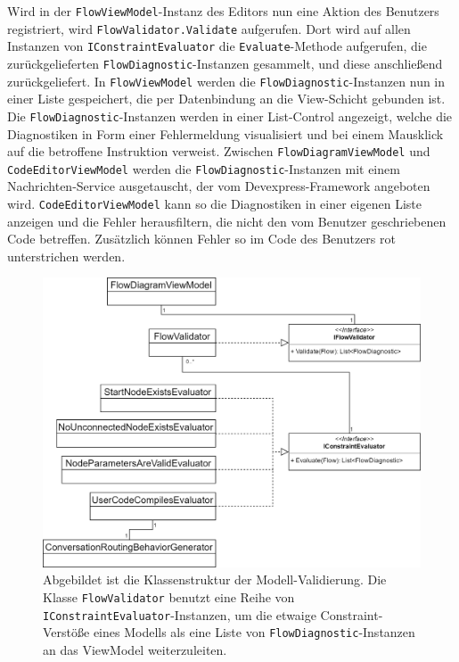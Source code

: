 Wird in der \texttt{FlowViewModel}-Instanz des Editors nun eine Aktion des Benutzers registriert, wird \texttt{FlowValidator.Validate} aufgerufen. Dort wird auf allen Instanzen von \texttt{IConstraintEvaluator} die \texttt{Evaluate}-Methode aufgerufen, die zurückgelieferten \texttt{FlowDiagnostic}-Instanzen gesammelt, und diese anschließend zurückgeliefert. In \texttt{FlowViewModel} werden die \texttt{FlowDiagnostic}-Instanzen nun in einer Liste gespeichert, die per Datenbindung an die View-Schicht gebunden ist. Die \texttt{FlowDiagnostic}-Instanzen werden in einer List-Control angezeigt, welche die Diagnostiken in Form einer Fehlermeldung visualisiert und bei einem Mausklick auf die betroffene Instruktion verweist. Zwischen \texttt{FlowDiagramViewModel} und \texttt{CodeEditorViewModel} werden die \texttt{FlowDiagnostic}-Instanzen mit einem Nachrichten-Service ausgetauscht, der vom Devexpress-Framework angeboten wird. \texttt{CodeEditorViewModel} kann so die Diagnostiken in einer eigenen Liste anzeigen und die Fehler herausfiltern, die nicht den vom Benutzer geschriebenen Code betreffen. Zusätzlich können Fehler so im Code des Benutzers rot unterstrichen werden.

\begin{figure} %
	\centering
		\includegraphics[width=\textwidth]{img/FlowValidatorClassStructure.png}
	\caption[Klassenstruktur der Modell-Validierung]{Abgebildet ist die Klassenstruktur der Modell-Validierung. Die Klasse \texttt{FlowValidator} benutzt eine Reihe von \texttt{IConstraintEvaluator}-Instanzen, um die etwaige Constraint-Verstöße eines Modells als eine Liste von \texttt{FlowDiagnostic}-Instanzen an das ViewModel weiterzuleiten.}
	\label{fig:UML:FlowValidatorClassStructure}
\end{figure}
